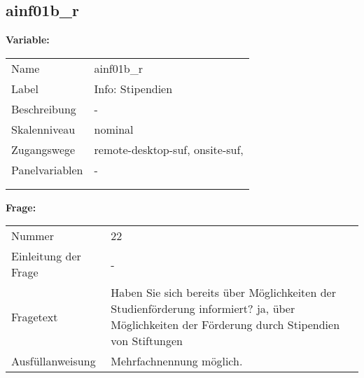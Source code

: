 	
	
	\subsection{ainf01b\_r}
	\label{subSection:ainf01b_r}

	\noindent\textbf{Variable:}\\
		\begin{tabular}{lL{11.3cm}}
			\label{tableVariable:ainf01b_r}
			Name & ainf01b\_r \\
			Label & Info: Stipendien \\
			Beschreibung & - \\
			Skalenniveau & nominal \\
			Zugangswege &
				remote-desktop-suf,
				onsite-suf,
 \\
			Panelvariablen & -
			 \\
			 \\
 \\
		\end{tabular}

		\vspace*{1 cm}
		\noindent\textbf{Frage:}\\
		\begin{tabular}{lL{11.3cm}}
			\label{tableQuestion:ainf01b_r}
			Nummer & 22 \\
			Einleitung der Frage & - \\
			Fragetext & Haben Sie sich bereits über Möglichkeiten der Studienförderung informiert?
ja, über Möglichkeiten der Förderung durch Stipendien von Stiftungen \\
			Ausfüllanweisung & Mehrfachnennung möglich. \\
		\end{tabular}





